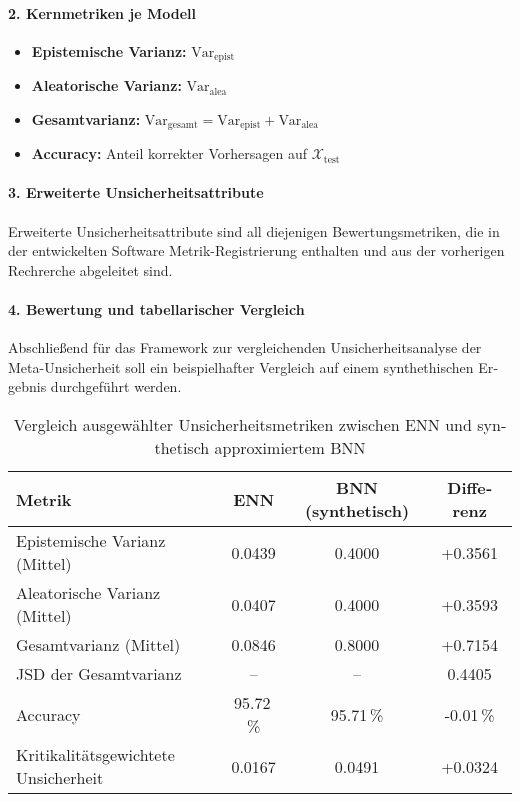 \begin{otherlanguage}{ngerman}

\paragraph{2. Kernmetriken je Modell}

\begin{itemize}
    \item \textbf{Epistemische Varianz:} \( \text{Var}_{\text{epist}} \)
    \item \textbf{Aleatorische Varianz:} \( \text{Var}_{\text{alea}} \)
    \item \textbf{Gesamtvarianz:} \( \text{Var}_{\text{gesamt}} = \text{Var}_{\text{epist}} + \text{Var}_{\text{alea}} \)
    \item \textbf{Accuracy:} Anteil korrekter Vorhersagen auf \( \mathcal{X}_{\text{test}} \)
\end{itemize}

\paragraph{3. Erweiterte Unsicherheitsattribute} Erweiterte Unsicherheitsattribute sind all diejenigen Bewertungsmetriken, die in der entwickelten Software Metrik-Registrierung enthalten und aus der vorherigen Rechrerche abgeleitet sind.

\paragraph{4. Bewertung und tabellarischer Vergleich} Abschließend für das Framework zur vergleichenden Unsicherheitsanalyse der Meta-Unsicherheit soll ein beispielhafter Vergleich auf einem synthethischen Ergebnis durchgeführt werden.

\begin{table}[h]
\centering
\begin{tabular}{|l|c|c|c|}
\hline
\textbf{Metrik} & \textbf{ENN} & \textbf{BNN (synthetisch)} & \textbf{Differenz} \\
\hline
Epistemische Varianz (Mittel)           & 0.0439 & 0.4000 & +0.3561 \\
Aleatorische Varianz (Mittel)           & 0.0407 & 0.4000 & +0.3593 \\
Gesamtvarianz (Mittel)                  & 0.0846 & 0.8000 & +0.7154 \\
JSD der Gesamtvarianz                   & --     & --     & 0.4405  \\
Accuracy                                & 95.72\,\% & 95.71\,\% & -0.01\,\% \\
Kritikalitätsgewichtete Unsicherheit    & 0.0167 & 0.0491 & +0.0324 \\
\hline
\end{tabular}
\caption{Vergleich ausgewählter Unsicherheitsmetriken zwischen ENN und synthetisch approximiertem BNN}
\end{table}


\end{otherlanguage}
